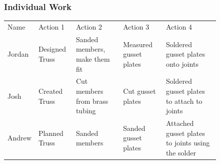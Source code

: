 \documentclass{article}
\let\Oldsubsubsection\subsubsection
\renewcommand{\subsubsection}{\FloatBarrier\Oldsubsubsection}
\begin{document}
\newpage

\begin{figure}

\subsubsection{Individual Work}

\bigskip

\begin{tabular}{lllll}
Name & Action 1 & Action 2 & Action 3 & Action 4 \\
Jordan & Designed Truss & Sanded members, make them fit & Measured gusset plates & Soldered gusset plates onto joints \\
Josh & Created Truss & Cut members from brass tubing & Cut gusset plates & Soldered gusset plates to attach to joints \\
Andrew & Planned Truss & Sanded members & Sanded gusset plates & Attached gusset plates to joints using the solder
\end{tabular}

\end{figure}

\end{document}
